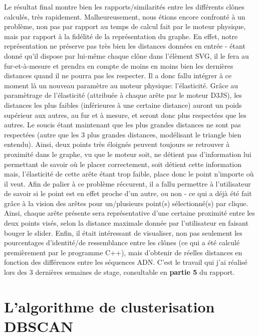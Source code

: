 \documentclass[12pt]{report}
\begin{document}
\begin{spacing}{1.2}
Le résultat final montre bien les rapports/similarités entre les différents clônes calculés, très rapidement.
\newline
Malheureusement, nous étions encore confronté à un problème, non pas par rapport au temps de calcul fait par le moteur physique, mais par rapport à la fidélité de la représentation du graphe.
\newline
En effet, notre représentation ne préserve pas très bien les distances données en entrée - étant donné qu'il dispose par lui-même chaque clône dans l'élèment SVG, il le fera au fur-et-à-mesure et prendra en compte de moins en moins bien les dernières distances quand il ne pourra pas les respecter.
\newline
Il a donc fallu intégrer à ce moment là un nouveau paramètre au moteur physique: l'élasticité. Grâce au paramètrage de l'élasticité (attribuée à chaque arête par le moteur D3JS), les distances les plus faibles (inférieures à une certaine distance) auront un poids supérieur aux autres, au fur et à mesure, et seront donc plus respectées que les autres.
\newline
Le soucis étant maintenant que les plus grandes distances ne sont pas respectées (autre que les 3 plus grandes distances, modélisant le triangle bien entendu). Ainsi, deux points très éloignés peuvent toujours se retrouver à proximité dans le graphe, vu que le moteur soit, ne détient pas d'information lui permettant de savoir où le placer correctement, soit détient cette information mais, l'élasticité de cette arête étant trop faible, place donc le point n'importe où il veut.
\newline
Afin de palier à ce problème réccurent, il a fallu permettre à l'utilisateur de savoir si le point est en effet proche d'un autre, ou non - ce qui a déjà été fait grâce à la vision des arêtes pour un/plusieurs point(s) sélectionné(s) par clique. Ainsi, chaque arête présente sera représentative d'une certaine proximité entre les deux points visés, selon la distance maximale donnée par l'utilisateur en faisant bouger le slider.
\newline
Enfin, il était intéressant de visualiser, non pas seulement les pourcentages d'identité/de ressemblance entre les clônes (ce qui a été calculé premièrement par le programme C++), mais d'obtenir de réelles distances en fonction des différences entre les séquences ADN. C'est le travail qui j'ai réalisé lors des 3 dernières semaines de stage, consultable en \textbf{partie 5} du rapport.

\chapter{L'algorithme de clusterisation DBSCAN}


\end{spacing}
\end{document}
